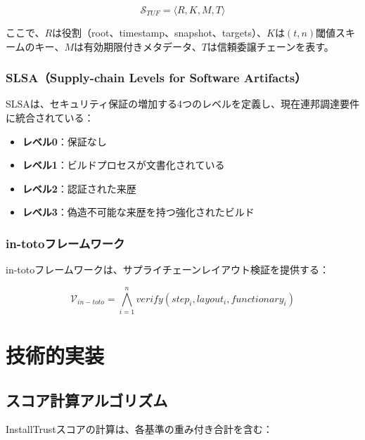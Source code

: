 \documentclass[Specialissue]{jsaiart}
\begin{document}
\begin{equation}
\mathcal{S}_{TUF} = \langle R, K, M, T \rangle
\end{equation}

ここで、$R$は役割（root、timestamp、snapshot、targets）、$K$は$(t,n)$閾値スキームのキー、$M$は有効期限付きメタデータ、$T$は信頼委譲チェーンを表す。

\subsubsection{SLSA（Supply-chain Levels for Software Artifacts）}

SLSAは、セキュリティ保証の増加する4つのレベルを定義し\cite{google2021slsa}、現在連邦調達要件に統合されている\cite{cisa2024sbom}：

\begin{itemize}
    \item \textbf{レベル0}：保証なし
    \item \textbf{レベル1}：ビルドプロセスが文書化されている
    \item \textbf{レベル2}：認証された来歴
    \item \textbf{レベル3}：偽造不可能な来歴を持つ強化されたビルド
\end{itemize}

\subsubsection{in-totoフレームワーク}

in-totoフレームワークは、サプライチェーンレイアウト検証を提供する\cite{torres2019intoto}：

\begin{equation}
\mathcal{V}_{in-toto} = \bigwedge_{i=1}^{n} verify(step_i, layout_i, functionary_i)
\end{equation}

\section{技術的実装}

\subsection{スコア計算アルゴリズム}

InstallTrustスコアの計算は、各基準の重み付き合計を含む：
\end{document}
